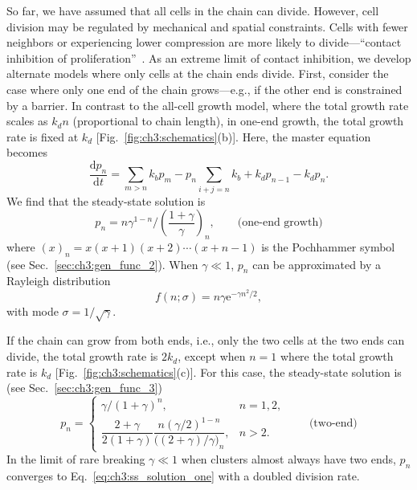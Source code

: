 So far, we have assumed that all cells in the chain can divide. However, cell division may be regulated by mechanical and spatial constraints. Cells with fewer neighbors or experiencing lower compression are more likely to divide---``contact inhibition of proliferation''~\cite{puliafito2012collective}. As an extreme limit of contact inhibition, we develop alternate models where only cells at the chain ends divide. First, consider the case where only one end of the chain grows---e.g., if the other end is constrained by a barrier. In contrast to the all-cell growth model, where the total growth rate scales as $k_dn$ (proportional to chain length), in one-end growth, the total growth rate is fixed at $k_d$ [Fig.~\ref{fig:ch3:schematics}(b)]. Here, the master equation becomes
\begin{equation}\label{eq:ch3:master_one}
    \frac{\mathrm{d} p_n}{\mathrm{d} t}=\sum_{m>n} k_b p_{m} -p_n\sum_{i+j=n}k_b+k_dp_{n-1}-k_dp_n.
\end{equation}
We find that the steady-state solution is
\begin{equation}\label{eq:ch3:ss_solution_one}
    p_n={n\gamma^{1-n}}\Big/{\left(\dfrac{1+\gamma}{\gamma}\right)_n},\qquad\textrm{(one-end growth)}
\end{equation}
where $(x)_n=x(x+1)(x+2)\cdots(x+n-1)$ is the Pochhammer symbol (see Sec.~\ref{sec:ch3:gen_func_2}). When $\gamma\ll 1$, $p_n$ can be approximated by a Rayleigh distribution
\begin{equation}
  f(n;\sigma)=n\gamma \mathrm{e}^{-\gamma n^2/2},
\end{equation}
with mode $\sigma =1/\sqrt{\gamma}$.

If the chain can grow from both ends, i.e., only the two cells at the two ends can divide, the total growth rate is $2k_d$, except when $n=1$ where the total growth rate is $k_d$ [Fig.~\ref{fig:ch3:schematics}(c)]. For this case, the steady-state solution is (see Sec.~\ref{sec:ch3:gen_func_3})
\begin{equation}\label{eq:ch3:ss_solution_two}
    p_n =
    \begin{cases}
        \gamma/(1+\gamma)^n, & n=1,2,\\[4pt]
        \dfrac{2+\gamma}{2(1+\gamma)}\dfrac{n(\gamma/2)^{1-n}}{\bm{(}(2+\gamma)/\gamma\bm{)}_n}, & n>2.
    \end{cases}\qquad\textrm{(two-end)}
\end{equation}
In the limit of rare breaking $\gamma\ll 1$ when clusters almost always have two ends, $p_n$ converges to Eq.~\eqref{eq:ch3:ss_solution_one} with a doubled division rate.

